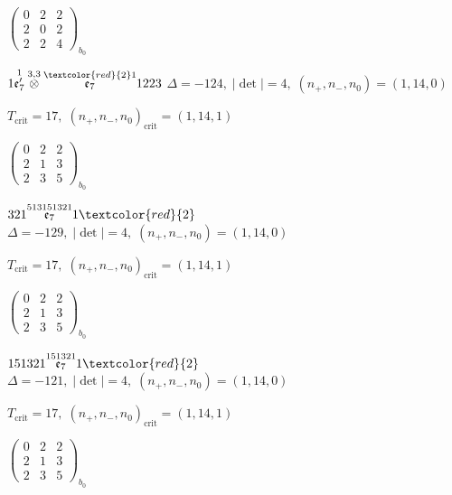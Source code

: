 \documentclass[10pt]{article}
\begin{document}
\hspace{2em}$\left(\begin{smallmatrix}0 & 2 & 2 \\ 2 & 0 & 2 \\ 2 & 2 & 4\end{smallmatrix}\right)_{\!b_0}$

\smallskip

$1\overset{1}{\mathfrak{e}_7'}\overset{3,3}{\otimes}\overset{\textcolor{red}{2}1}{\mathfrak{e}_7}1223$ \quad $\Delta=-124,\; |\det|=4,\; (n_+,n_-,n_0)=(1,14,0)$

\hspace{1em}$T_{\text{crit}}=17,\; (n_+,n_-,n_0)_{\text{crit}}=(1,14,1)$

\hspace{2em}$\left(\begin{smallmatrix}0 & 2 & 2 \\ 2 & 1 & 3 \\ 2 & 3 & 5\end{smallmatrix}\right)_{\!b_0}$

\smallskip

$321\overset{513151321}{\mathfrak{e}_7}1\textcolor{red}{2}$ \quad $\Delta=-129,\; |\det|=4,\; (n_+,n_-,n_0)=(1,14,0)$

\hspace{1em}$T_{\text{crit}}=17,\; (n_+,n_-,n_0)_{\text{crit}}=(1,14,1)$

\hspace{2em}$\left(\begin{smallmatrix}0 & 2 & 2 \\ 2 & 1 & 3 \\ 2 & 3 & 5\end{smallmatrix}\right)_{\!b_0}$

\smallskip

$151321\overset{151321}{\mathfrak{e}_7}1\textcolor{red}{2}$ \quad $\Delta=-121,\; |\det|=4,\; (n_+,n_-,n_0)=(1,14,0)$

\hspace{1em}$T_{\text{crit}}=17,\; (n_+,n_-,n_0)_{\text{crit}}=(1,14,1)$

\hspace{2em}$\left(\begin{smallmatrix}0 & 2 & 2 \\ 2 & 1 & 3 \\ 2 & 3 & 5\end{smallmatrix}\right)_{\!b_0}$
\end{document}
